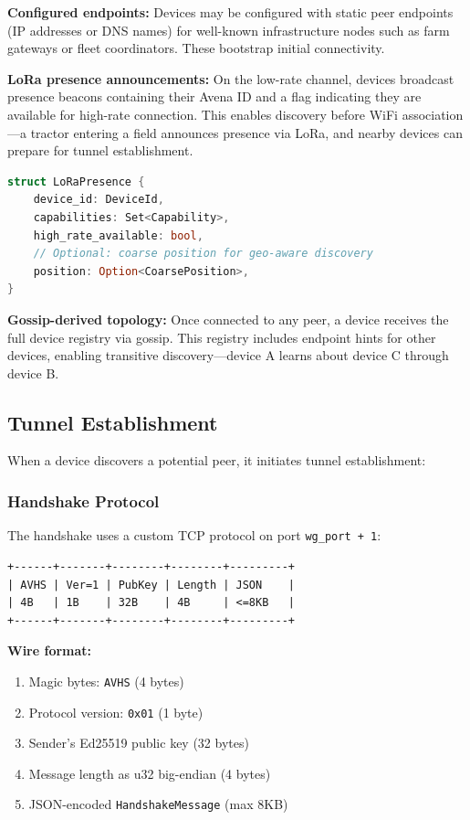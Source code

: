 \textbf{Configured endpoints:} Devices may be configured with static peer endpoints (IP addresses or DNS names) for well-known infrastructure nodes such as farm gateways or fleet coordinators. These bootstrap initial connectivity.

\textbf{LoRa presence announcements:} On the low-rate channel, devices broadcast presence beacons containing their Avena ID and a flag indicating they are available for high-rate connection. This enables discovery before WiFi association---a tractor entering a field announces presence via LoRa, and nearby devices can prepare for tunnel establishment.

\begin{lstlisting}[language=Rust]
struct LoRaPresence {
    device_id: DeviceId,
    capabilities: Set<Capability>,
    high_rate_available: bool,
    // Optional: coarse position for geo-aware discovery
    position: Option<CoarsePosition>,
}
\end{lstlisting}

\textbf{Gossip-derived topology:} Once connected to any peer, a device receives the full device registry via gossip. This registry includes endpoint hints for other devices, enabling transitive discovery---device A learns about device C through device B.

\subsection{Tunnel Establishment}

When a device discovers a potential peer, it initiates tunnel establishment:

\subsubsection{Handshake Protocol}

The handshake uses a custom TCP protocol on port \texttt{wg\_port + 1}:

\begin{lstlisting}
+------+-------+--------+--------+---------+
| AVHS | Ver=1 | PubKey | Length | JSON    |
| 4B   | 1B    | 32B    | 4B     | <=8KB   |
+------+-------+--------+--------+---------+
\end{lstlisting}

\textbf{Wire format:}
\begin{enumerate}[nosep]
    \item Magic bytes: \texttt{AVHS} (4 bytes)
    \item Protocol version: \texttt{0x01} (1 byte)
    \item Sender's Ed25519 public key (32 bytes)
    \item Message length as u32 big-endian (4 bytes)
    \item JSON-encoded \texttt{HandshakeMessage} (max 8KB)
\end{enumerate}

